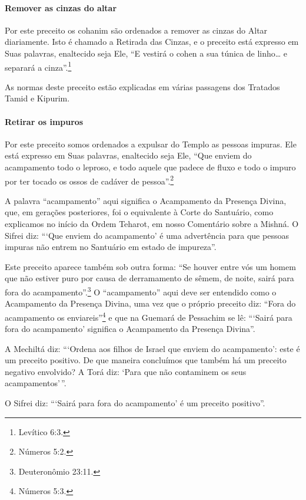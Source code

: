 \begin{multicols}{2}
\paragraph{Remover as cinzas do altar}

Por este preceito os cohanim\starr{} são ordenados a remover as cinzas do
Altar diariamente. Isto é chamado a Retirada das Cinzas, e o preceito
está expresso em Suas palavras, enaltecido seja Ele, ``E vestirá o
cohen\starr{} a sua túnica de linho\ldots{} e separará a cinza''.\footnote{Levítico 6:3.}

As normas deste preceito estão explicadas em várias passagens dos
Tratados Tamid\starr{} e Kipurim\starr.

\paragraph{Retirar os impuros}

Por este preceito somos ordenados a expulsar do Templo as pessoas
impuras. Ele está expresso em Suas palavras, enaltecido seja Ele, ``Que
enviem do acampamento todo o leproso, e todo aquele que padece de fluxo
e todo o impuro por ter tocado os ossos de cadáver de pessoa''.\footnote{Números
5:2.}

A palavra ``acampamento'' aqui significa o Acampamento da Presença
Divina, que, em gerações posteriores, foi o equivalente à Corte do
Santuário, como explicamos no início da Ordem Teharot\starr, em nosso
Comentário sobre a Mishná\starr. O Sifrei\starr{} diz: ```Que enviem do acampamento'
é uma advertência para que pessoas impuras não entrem no Santuário em
estado de impureza''.

Este preceito aparece também sob outra forma: ``Se houver entre vós
um homem que não estiver puro por causa de derramamento de sêmem, de
noite, sairá para fora do acampamento''.\footnote{Deuteronômio 23:11.} O
``acampamento'' aqui deve ser entendido como o Acampamento da Presença
Divina, uma vez que o próprio preceito diz: ``Fora do acampamento os
enviareis''\footnote{Números 5:3.} e que na Guemará\starr{} de Pessachim\starr{} se lê: ```Sairá
para fora do acampamento' significa o Acampamento da Presença Divina''.

A Mechiltá\starr{} diz: ```Ordena aos filhos de Israel que enviem do
acampamento': este é um preceito positivo. De que maneira concluímos que
também há um preceito negativo envolvido? A Torá\starr{} diz: `Para que não
contaminem os seus acampamentos'\,''.

O Sifrei\starr{} diz: ```Sairá para fora do acampamento' é um preceito positivo''.


\end{multicols}
